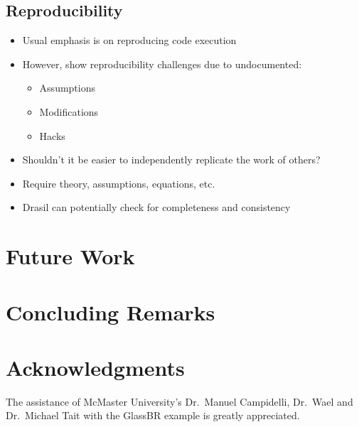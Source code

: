 \documentclass[sigconf]{acmart}
\begin{document}
\subsection{Reproducibility}

\begin{itemize}
\item Usual emphasis is on reproducing code execution
\item However, \cite{IonescuAndJansson2013} show reproducibility challenges due to
undocumented:
\begin{itemize}
\item Assumptions
\item Modifications
\item Hacks
\end{itemize}
\item Shouldn't it be easier to independently replicate the work of others?
\item Require theory, assumptions, equations, etc.
\item Drasil can potentially check for completeness and consistency
\end{itemize}

\section{Future Work}

\section{Concluding Remarks}

\section{Acknowledgments}

The assistance of McMaster University's Dr.\ Manuel Campidelli, Dr.\ Wael and
Dr.\ Michael Tait with the GlassBR example is greatly appreciated.


 
\end{document}
